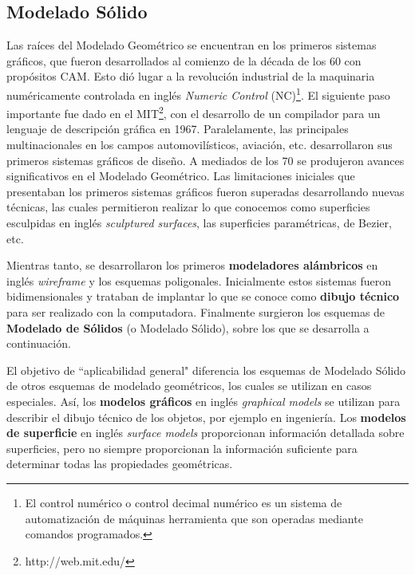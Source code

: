 \clearpage
\subsection{Modelado Sólido}
Las raíces del Modelado Geométrico se encuentran en los primeros sistemas gráficos, que fueron desarrollados al comienzo de la década de los 60 con propósitos CAM. Esto dió lugar a la revolución industrial de la maquinaria numéricamente controlada en inglés \textit{Numeric Control} (NC)\footnote{El control numérico o control decimal numérico es un sistema de automatización de máquinas herramienta que son operadas mediante comandos programados.}.
El siguiente paso importante fue dado en el MIT\footnote{http://web.mit.edu/}, con el desarrollo de un compilador para un lenguaje de descripción gráfica en 1967. Paralelamente, las principales multinacionales en los campos automovilísticos, aviación, etc. desarrollaron sus primeros sistemas gráficos de diseño.
A mediados de los 70 se produjeron avances significativos en el Modelado Geométrico. Las limitaciones iniciales que presentaban los primeros sistemas gráficos fueron superadas desarrollando nuevas técnicas, las cuales permitieron realizar lo que conocemos como superficies esculpidas en inglés \textit{sculptured surfaces}, las superficies paramétricas, de Bezier, etc.

Mientras tanto, se desarrollaron los primeros \textbf{modeladores alámbricos} en inglés \textit{wireframe} y los esquemas poligonales. Inicialmente estos sistemas fueron bidimensionales y trataban de implantar lo que se conoce como \textbf{dibujo técnico} para ser realizado con la computadora.
Finalmente surgieron los esquemas de \textbf{Modelado de Sólidos} (o Modelado Sólido), sobre los que se desarrolla a continuación.
 \citep{Ramos2011} 

El objetivo de ``aplicabilidad general" diferencia los esquemas de Modelado Sólido de otros esquemas de modelado geométricos, los cuales se utilizan en casos especiales. Así, los \textbf{modelos gráficos} en inglés \textit{graphical models} se utilizan para describir el dibujo técnico de los objetos, por ejemplo en ingeniería.
Los \textbf{modelos de superficie} en inglés \textit{surface models} proporcionan información detallada sobre superficies, pero no siempre proporcionan la información suficiente para determinar todas las propiedades geométricas. 


